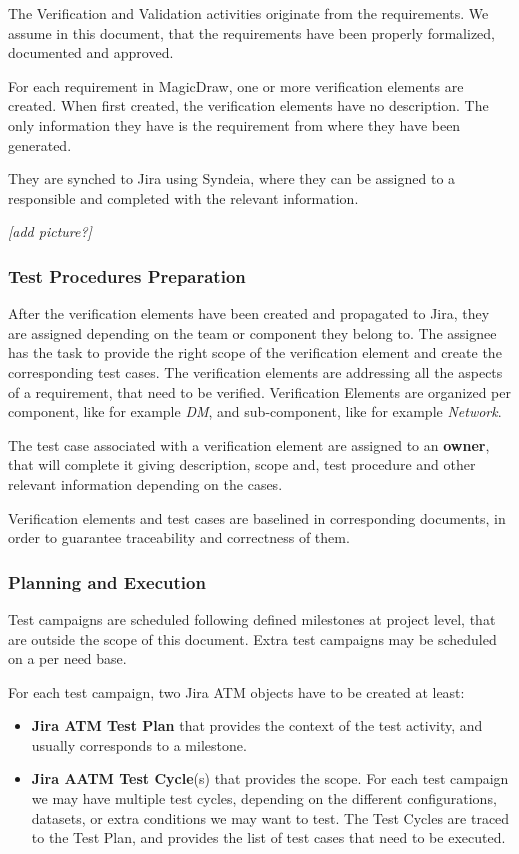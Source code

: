 The Verification and Validation activities originate from the requirements.
We assume in this document, that the requirements have been properly formalized, documented and approved.

For each requirement in MagicDraw, one or more verification elements are created.
When first created, the verification elements have no description. The only information they have is the requirement from where they have been generated.

They are synched to Jira using Syndeia, where they can be assigned to a responsible and completed with the relevant information.

\textit{[add picture?]}


\subsubsection{Test Procedures Preparation}

After the verification elements have been created and propagated to Jira, they are assigned depending on the team or
component they belong to.
The assignee has the task to provide the right scope of the verification element and create the corresponding test cases.
The verification elements are addressing all the aspects of a  requirement, that need to be verified.
Verification Elements are organized per component, like for example \textit{DM}, and sub-component, like for example \textit{Network}. 

The test case associated with a verification element are assigned to an \textbf{owner},  that will complete it giving description,
 scope and, test procedure and other relevant information depending on the cases.

Verification elements and test cases are baselined in corresponding documents, in order to guarantee traceability and correctness of them.


\subsubsection{Planning and Execution}

Test campaigns are scheduled following defined milestones at project level, that are outside the scope of this document.
Extra test campaigns may be scheduled on a per need base.

For each test campaign, two Jira ATM objects have to be created at least:

\begin{itemize}
\item \textbf{Jira ATM Test Plan} that provides the context of the test activity, and usually corresponds to a milestone.
\item \textbf{Jira AATM Test Cycle}(s) that provides the scope. For each test campaign we may have multiple test cycles, 
depending on the different configurations, datasets, or extra conditions we may want to test. The Test Cycles are traced
to the Test Plan, and provides the list of test cases that need to be executed.
\end{itemize}

